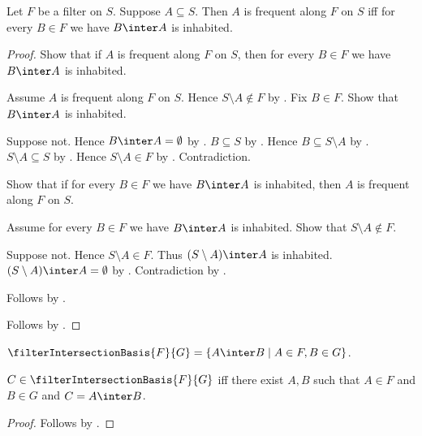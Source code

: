 \begin{theorem}\label{filter_frequent_iff_intersects_every_eventual_set}
    Let $F$ be a filter on $S$.
    Suppose $A\subseteq S$.
    Then $A$ is frequent along $F$ on $S$ iff
        for every $B\in F$ we have $B\inter A$ is inhabited.
\end{theorem}
\begin{proof}
    Show that if $A$ is frequent along $F$ on $S$, then
        for every $B\in F$ we have $B\inter A$ is inhabited.
    \begin{subproof}
        Assume $A$ is frequent along $F$ on $S$.
        Hence $S\setminus A\notin F$ by .
        Fix $B\in F$.
        Show that $B\inter A$ is inhabited.
        \begin{subproof}
            Suppose not.
            Hence $B\inter A=\emptyset$ by .
            $B\subseteq S$ by .
            Hence $B\subseteq S\setminus A$ by .
            $S\setminus A\subseteq S$ by .
            Hence $S\setminus A\in F$ by .
            Contradiction.
        \end{subproof}
    \end{subproof}

    Show that if for every $B\in F$ we have $B\inter A$ is inhabited,
        then $A$ is frequent along $F$ on $S$.
    \begin{subproof}
        Assume for every $B\in F$ we have $B\inter A$ is inhabited.
        Show that $S\setminus A\notin F$.
        \begin{subproof}
            Suppose not.
            Hence $S\setminus A\in F$.
            Thus $(S\setminus A)\inter A$ is inhabited.
            $(S\setminus A)\inter A=\emptyset$ by
                .
            Contradiction by .
        \end{subproof}
        Follows by .
    \end{subproof}
    Follows by \auto.
\end{proof}

\begin{definition}\label{filter_intersection_basis}
    $\filterIntersectionBasis{F}{G}
        =\{A\inter B\mid A\in F,B\in G\}$.
\end{definition}

\begin{proposition}\label{filter_intersection_basis_iff}
    $C\in\filterIntersectionBasis{F}{G}$ iff
        there exist $A,B$ such that $A\in F$ and $B\in G$ and
        $C=A\inter B$.
\end{proposition}
\begin{proof}
    Follows by .
\end{proof}


